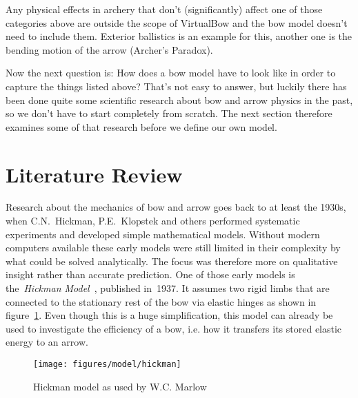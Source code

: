 Any physical effects in archery that don't (significantly) affect one of those categories above are outside the scope of VirtualBow and the bow model doesn't need to include them.
Exterior ballistics is an example for this, another one is the bending motion of the arrow (Archer's Paradox).

Now the next question is: How does a bow model have to look like in order to capture the things listed above?
That's not easy to answer, but luckily there has been done quite some scientific research about bow and arrow physics in the past, so we don't have to start completely from scratch.
The next section therefore examines some of that research before we define our own model.

\section{Literature Review}

Research about the mechanics of bow and arrow goes back to at least the 1930s, when C.N.~Hickman, P.E.~Klopstek and others performed systematic experiments and developed simple mathematical models.
Without modern computers available these early models were still limited in their complexity by what could be solved analytically.
The focus was therefore more on qualitative insight rather than accurate prediction.
One of those early models is the~\textit{Hickman Model}~\cite{bib:hi37}, published in~1937.
It assumes two rigid limbs that are connected to the stationary rest of the bow via elastic hinges as shown in figure~\ref{fig:model:hickman}.
Even though this is a huge simplification, this model can already be used to investigate the efficiency of a bow, i.e. how it transfers its stored elastic energy to an arrow.

\begin{figure}[h]
\centering
\texttt{[image: figures/model/hickman]}
\caption{Hickman model as used by W.C. Marlow \cite{bib:ma80}}
\label{fig:model:hickman}
\end{figure}

